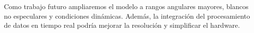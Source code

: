 \documentclass[11pt,a4paper]{article}
\begin{document}
\begin{multicols}{2}
Como trabajo futuro ampliaremos el modelo a rangos angulares mayores, blancos no especulares y condiciones dinámicas. Además, la integración del procesamiento de datos en tiempo real podría mejorar la resolución y simplificar el hardware.

\end{multicols}
\end{document}
